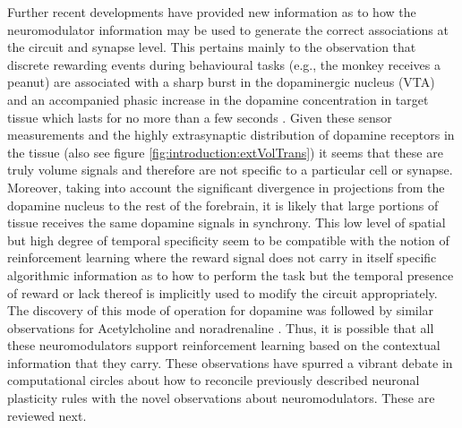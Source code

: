    Further recent developments have provided new information as to how the neuromodulator information may be used to generate the correct associations at the circuit and synapse level. This pertains mainly to the observation that discrete rewarding events during behavioural tasks (e.g., the monkey receives a peanut) are associated with a sharp burst in the dopaminergic nucleus (VTA) and an accompanied phasic increase in the dopamine concentration in target tissue which lasts for no more than a few seconds \cite{schultz1997neural,venton2003real,arbuthnott2007space}. Given these sensor measurements and the highly extrasynaptic distribution of dopamine receptors in the tissue \cite{rice2008dopamine,taber2014volume} (also see figure \ref{fig:introduction:extVolTrans}) it seems that these are truly volume signals and therefore are not specific to a particular cell or synapse. Moreover, taking into account the significant divergence in projections from the dopamine nucleus to the rest of the forebrain, it is likely that large portions of tissue receives the same dopamine signals in synchrony. This low level of spatial but high degree of temporal specificity seem to be compatible with the notion of reinforcement learning where the reward signal does not carry in itself specific algorithmic information as to how to perform the task but the temporal presence of reward or lack thereof is implicitly used to modify the circuit appropriately. The discovery of this mode of operation for dopamine was followed by similar observations for Acetylcholine \cite{sarter2009phasic} and noradrenaline \cite{dugast2002vivo}. Thus, it is possible that all these neuromodulators support reinforcement learning based on the contextual information that they carry. These observations have spurred a vibrant debate in computational circles about how to reconcile previously described neuronal plasticity rules with the novel observations about neuromodulators. These are reviewed next.

